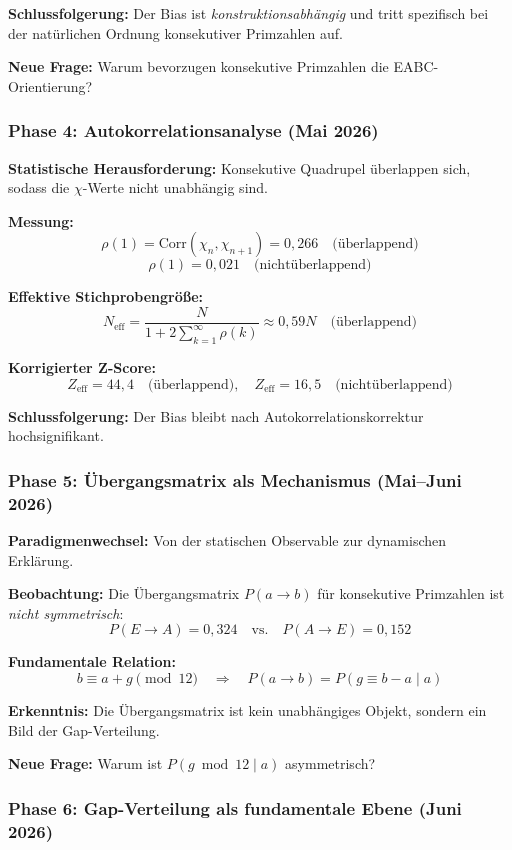 \documentclass[11pt,a4paper]{article}
\begin{document}
\textbf{Schlussfolgerung:} Der Bias ist \textit{konstruktionsabhängig} und tritt spezifisch bei der natürlichen Ordnung konsekutiver Primzahlen auf.

\textbf{Neue Frage:} Warum bevorzugen konsekutive Primzahlen die EABC-Orientierung?

\subsubsection{Phase 4: Autokorrelationsanalyse (Mai 2026)}

\textbf{Statistische Herausforderung:} Konsekutive Quadrupel überlappen sich, sodass die $\chi$-Werte nicht unabhängig sind.

\textbf{Messung:}
\[
\rho(1) = \text{Corr}(\chi_n, \chi_{n+1}) = 0{,}266 \quad \text{(überlappend)}
\]
\[
\rho(1) = 0{,}021 \quad \text{(nichtüberlappend)}
\]

\textbf{Effektive Stichprobengröße:}
\[
N_{\text{eff}} = \frac{N}{1 + 2\sum_{k=1}^\infty \rho(k)} \approx 0{,}59 N \quad \text{(überlappend)}
\]

\textbf{Korrigierter Z-Score:}
\[
Z_{\text{eff}} = 44{,}4 \quad \text{(überlappend)}, \quad Z_{\text{eff}} = 16{,}5 \quad \text{(nichtüberlappend)}
\]

\textbf{Schlussfolgerung:} Der Bias bleibt nach Autokorrelationskorrektur hochsignifikant.

\subsubsection{Phase 5: Übergangsmatrix als Mechanismus (Mai--Juni 2026)}

\textbf{Paradigmenwechsel:} Von der statischen Observable zur dynamischen Erklärung.

\textbf{Beobachtung:} Die Übergangsmatrix $P(a \to b)$ für konsekutive Primzahlen ist \textit{nicht symmetrisch}:
\[
P(E \to A) = 0{,}324 \quad \text{vs.} \quad P(A \to E) = 0{,}152
\]

\textbf{Fundamentale Relation:}
\[
b \equiv a + g \pmod{12} \quad \Rightarrow \quad P(a \to b) = P(g \equiv b - a \mid a)
\]

\textbf{Erkenntnis:} Die Übergangsmatrix ist kein unabhängiges Objekt, sondern ein Bild der Gap-Verteilung.

\textbf{Neue Frage:} Warum ist $P(g \bmod 12 \mid a)$ asymmetrisch?

\subsubsection{Phase 6: Gap-Verteilung als fundamentale Ebene (Juni 2026)}
\end{document}
